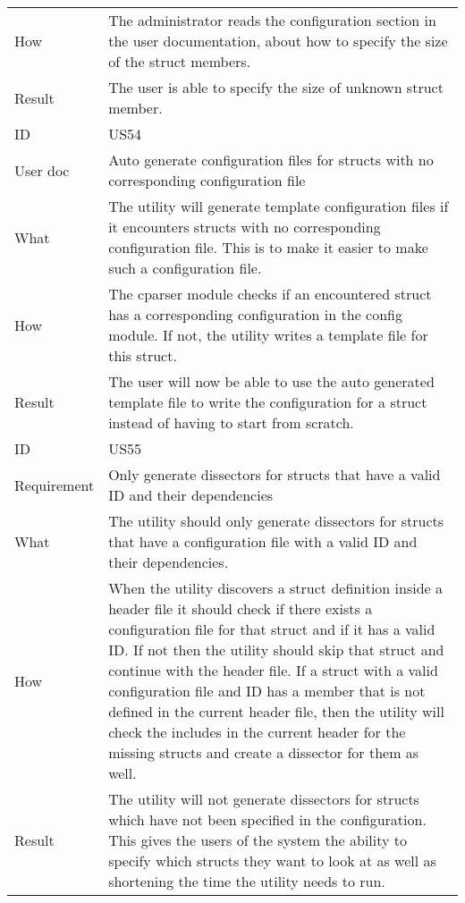 \begin{table}[htbp]
{\begin{tabularx}{1.2\textwidth}{l X}
	How & The administrator reads the configuration section in the user documentation, about how to specify the size of the \gls{struct} \glspl{member}. \\
	Result & The user is able to specify the size of unknown \gls{struct} \gls{member}. \\	
	\midrule
	ID & US54 \\
	User doc & Auto generate configuration files for \glspl{struct} with no corresponding configuration file \\
	What & The \gls{utility} will generate template configuration files if it encounters \glspl{struct} with no corresponding configuration file. This is to make it easier to make such a configuration file.   \\
	How & The cparser module checks if an encountered \gls{struct} has a corresponding configuration in the config module. If not, the \gls{utility} writes a template file for this \gls{struct}.   \\
	Result & The user will now be able to use the auto generated template file to write the configuration for a \gls{struct} instead of having to start from scratch. \\
	\midrule
	ID & US55 \\
	Requirement & Only generate \glspl{dissector} for \glspl{struct} that have a valid ID and their dependencies \\
	What & The \gls{utility} should only generate \glspl{dissector} for \glspl{struct} that have a configuration file with a valid ID and their dependencies.    \\
	How & When the \gls{utility} discovers a \gls{struct} definition inside a \gls{header} file it should check if there exists a configuration file for that \gls{struct} and if it has a valid ID.
	If not then the \gls{utility} should skip that \gls{struct} and continue with the \gls{header} file. If a \gls{struct} with a valid configuration file and ID has a \gls{member} that is not defined in the current \gls{header}
	file, then the \gls{utility} will check the includes in the current \gls{header} for the missing \glspl{struct} and create a \gls{dissector} for them as well.\\
	Result & The \gls{utility} will not generate \glspl{dissector} for \glspl{struct} which have not been specified in the configuration.
	This gives the users of the system the ability to specify which \glspl{struct} they want to look at as well as shortening the time the \gls{utility} needs to run. \\
	\bottomrule
\end{tabularx}}
\end{table}

